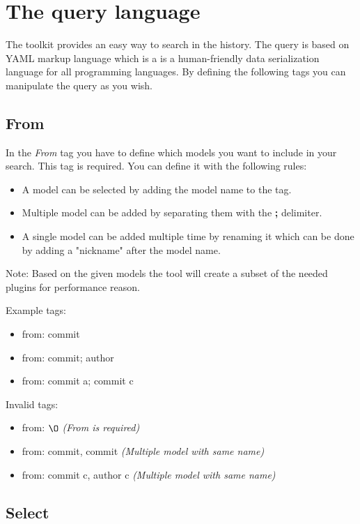 \section{The query language}

The toolkit provides an easy way to search in the history.
The query is based on YAML\cite{yaml} markup language which is a is a human-friendly data serialization language for all programming languages. 
By defining the following tags you can manipulate the query as you wish.


\subsection{From}

In the \textit{From} tag you have to define which models you want to include in your search.
This tag is required.
You can define it with the following rules:

\begin{itemize}
	\item A model can be selected by adding the model name to the tag.
	\item Multiple model can be added by separating them with the \textbf{;} delimiter.
	\item A single model can be added multiple time by renaming it which can be done by adding a "nickname" after the model name.
\end{itemize}

Note: Based on the given models the tool will create a subset of the needed plugins for performance reason.

Example tags:
\begin{itemize}
	\item from: commit
	\item from: commit; author
	\item from: commit a; commit c
\end{itemize}

Invalid tags:
\begin{itemize}
	\item from: $\O$ \textit{(From is required)}
	\item from: commit, commit \textit{(Multiple model with same name)}
	\item from: commit c, author c \textit{(Multiple model with same name)}
\end{itemize}

\subsection{Select}

